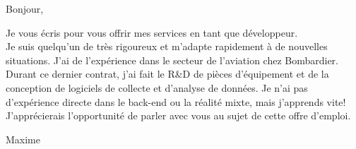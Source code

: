 \documentclass[12pt,french]{letter}
\begin{document}

\begin{letter}{}
\address{Montréal, Canada}

\opening{Bonjour,}


Je vous écris pour vous offrir mes services en tant que développeur.
\\ Je suis quelqu'un de très rigoureux et m'adapte rapidement à de nouvelles situations. J'ai de l'expérience dans le secteur de l'aviation chez Bombardier. Durant ce dernier contrat, j'ai fait le R\&D de pièces d'équipement et de la conception de logiciels de collecte et d'analyse de données. 
Je n'ai pas d'expérience directe dans le back-end ou la réalité mixte, mais j'apprends vite!
\\J'apprécierais l'opportunité de parler avec vous au sujet de cette offre d'emploi.

\closing{Maxime}


\end{letter}
\end{document}
